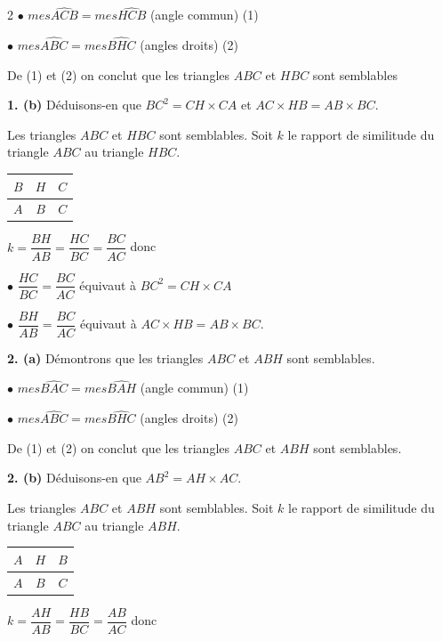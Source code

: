 \begin{multicols*}{2}
  	$\bullet$ $mes\widehat{ACB}=mes\widehat{HCB}$ (angle commun)  (1)
  	
  	$\bullet$ $mes\widehat{ABC}=mes\widehat{BHC}$ (angles droits)  (2)
  	
  	De (1) et (2)  on conclut que les triangles $ABC$ et $HBC$ sont semblables
  	
  	\textbf{1. (b)} Déduisons-en que $BC^2= CH \times CA$ et $AC\times HB= AB\times BC$.
  	
  	Les triangles $ABC$ et $HBC$ sont semblables. Soit $k$ le rapport de similitude du triangle $ABC$ au triangle $HBC$.
  	
  	\begin{tabular}{|c|c|c|}
  		\hline
  		$B$&  $H$& $C$ \\
  		\hline
  		$A$&$B$  & $C$ \\
  		\hline
  	\end{tabular}
  	$k=\dfrac{BH}{AB}=\dfrac{HC}{BC}=\dfrac{BC}{AC}$ donc \vspace{0.2cm}
  	
  	$\bullet$ $\dfrac{HC}{BC}=\dfrac{BC}{AC}$ équivaut à $BC^2= CH \times CA$ \vspace{0.2cm}
  	
  	$\bullet$ $\dfrac{BH}{AB}=\dfrac{BC}{AC}$ équivaut à $AC\times HB= AB\times BC$.\vspace{0.2cm}
  	
  	\textbf{2. (a)} Démontrons que les triangles $ABC$ et $ABH$ sont semblables.
  	
  	$\bullet$ $mes\widehat{BAC}=mes\widehat{BAH}$ (angle commun)  (1)
  	
  	$\bullet$ $mes\widehat{ABC}=mes\widehat{BHC}$ (angles droits)  (2)
  	
  	De (1) et (2)  on conclut que les triangles $ABC$ et $ABH$ sont semblables.
  	
  	\textbf{2. (b)} Déduisons-en que $AB^2= AH \times AC$.
  	
  	Les triangles $ABC$ et $ABH$ sont semblables. Soit $k$ le rapport de similitude du triangle $ABC$ au triangle $ABH$.
  	
  	\begin{tabular}{|c|c|c|}
  		\hline
  		$A$&  $H$& $B$ \\
  		\hline
  		$A$&$B$  & $C$ \\
  		\hline
  	\end{tabular}
  	$k=\dfrac{AH}{AB}=\dfrac{HB}{BC}=\dfrac{AB}{AC}$ donc \vspace{0.2cm}
  	

\end{multicols*}
